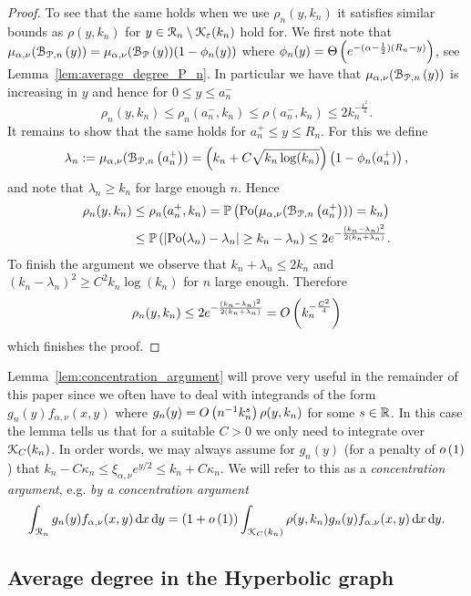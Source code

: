 \begin{proof}
To see that the same holds when we use $\rho_n(y,k_n)$ it satisfies similar bounds as $\rho(y,k_n)$ for $y \in {\mathcal R}_n \setminus {\mathcal K}_\varepsilon(k_n)$ hold for. We first note that $\mu_{\alpha, \nu}({\mathcal B}_{{\mathcal P},n}\left(y\right)) = \mu_{\alpha, \nu}({\mathcal B}_{{\mathcal P}}\left(y\right))(1 - \phi_n(y))$ where $\phi_n(y) = \Theta\left(e^{-(\alpha - \frac{1}{2})(R_n - y)}\right)$, see Lemma~\ref{lem:average_degree_P_n}. In particular we have that $\mu_{\alpha, \nu}({\mathcal B}_{{\mathcal P},n}\left(y\right))$ is increasing in $y$ and hence for $0 \le y \le a_n^-$
\[
	\rho_n(y,k_n) \le \rho_n(a_n^-,k_n) \le \rho(a_n^-,k_n) \le 2 k_n^{-\frac{\varepsilon^2}{4}}.
\]
It remains to show that the same holds for $a_n^+ \le y \le R_n$. For this we define 
\[
	\lambda_n := \mu_{\alpha, \nu}({\mathcal B}_{{\mathcal P},n}\left(a_n^+\right)) = \left(k_n + C \sqrt{k_n \log(k_n)}\right)
	\left(1 - \phi_n(a_n^+)\right),
\] 
and note that $\lambda_n \ge k_n$ for large enough $n$. Hence
\begin{align*}
	\rho_n(y,k_n) &\le \rho_n(a_n^+,k_n) = \mathbb{P}\left({\mathrm{Po}}(\mu_{\alpha, \nu}({\mathcal B}_{{\mathcal P},n}\left(a_n^+\right))) = k_n\right)\\
	&\le \mathbb{P}\left(\left|{\mathrm{Po}}(\lambda_n) - \lambda_n\right| \ge k_n - \lambda_n\right) \le 2e^{-\frac{(k_n - \lambda_n)^2}{2(k_n + \lambda_n)}}.
\end{align*}
To finish the argument we observe that $k_n + \lambda_n \le 2k_n$ and $(k_n - \lambda_n)^2 \ge C^2 k_n \log(k_n)$ for $n$ large enough. Therefore
\[
	\rho_n(y,k_n) \le 2e^{-\frac{(k_n - \lambda_n)^2}{2(k_n + \lambda_n)}} = O\left(k_n^{-\frac{C^2}{4}}\right)
\] 
which finishes the proof.
\end{proof}

\begin{remark}\label{rmk:concentration_argument}
Lemma~\ref{lem:concentration_argument} will prove very useful in the remainder of this paper since we often have to deal with integrands of the form $g_n(y) f_{\alpha,\nu}(x,y)$ where $g_n(y) = O\left(n^{-1} k_n^{s}\right)\rho(y,k_n)$ for some $s \in {\ensuremath{\mathbb R}}$. In this case the lemma tells us that for a suitable $C > 0$ we only need to integrate over ${\mathcal K}_C(k_n)$. In order words, we may always assume for $g_n(y)$ (for a penalty of $o\left(1\right)$) that $k_n - C \kappa_n \le \xi_{\alpha,\nu} e^{y/2} \le k_n + C \kappa_n$. We will refer to this as a \emph{concentration argument}, e.g. \emph{by a concentration argument}
\[
	\int_{{\mathcal R}_n} g_n(y) f_{\alpha, \nu}(x,y) \operatorname{\mathrm{d}\hspace{-2pt}} x \operatorname{\mathrm{d}\hspace{-2pt}} y 
	= (1+o\left(1\right)) \int_{{\mathcal K}_C(k_n)} \rho(y,k_n) g_n(y) f_{\alpha, \nu}(x,y) \operatorname{\mathrm{d}\hspace{-2pt}} x \operatorname{\mathrm{d}\hspace{-2pt}} y.
\]
\end{remark}

\subsection{Average degree in the Hyperbolic graph}\label{ssec:average_degree_HP_n}


